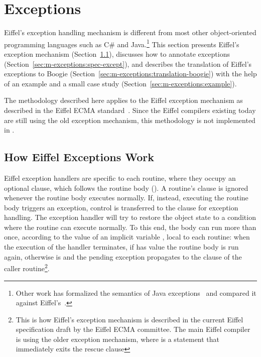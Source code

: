 \section{Exceptions}
\label{sec:m-exceptions}

Eiffel's exception handling mechanism is different from most other object-oriented programming languages such as C\# and Java.\footnote{Other work has formalized the semantics of Java exceptions~\cite{MUELLER07} and compared it against Eiffel's~\cite{NORDIO09}.}
This section presents Eiffel's exception mechanism (Section~\ref{sec:m-exceptions:eiff-except-mech}), discusses how to annotate exceptions (Section~\ref{sec:m-exceptions:spec-except}), and describes the translation of Eiffel's exceptions to Boogie (Section~\ref{sec:m-exceptions:translation-boogie}) with the help of an example and a small case study (Section~\ref{sec:m-exceptions:example}).

The methodology described here applies to the Eiffel exception mechanism as described in the Eiffel ECMA standard~\cite{ECMA367}.
Since the Eiffel compilers existing today are still using the old exception mechanism, this methodology is not implemented in \AutoProof.


\subsection{How Eiffel Exceptions Work} \label{sec:m-exceptions:eiff-except-mech}


Eiffel exception handlers are specific to each routine, where they occupy an optional  clause, which follows the routine body ().
A routine's  clause is ignored whenever the routine body executes normally. 
If, instead, executing the routine body triggers an exception, control is transferred to the   clause for exception handling.
The exception handler will try to restore the object state to a condition where the routine can execute normally.
To this end, the body can run more than once, according to the value of an implicit variable , local to each routine: when the execution of the handler terminates, if  has value  the routine body is run again, otherwise  is  and the pending exception propagates to the  clause of the caller routine\footnote{This is how Eiffel's exception mechanism is described in the current Eiffel specification draft by the Eiffel ECMA committee. The main Eiffel compiler is using the older exception mechanism, where  is a statement that immediately exits the rescue clause}.

